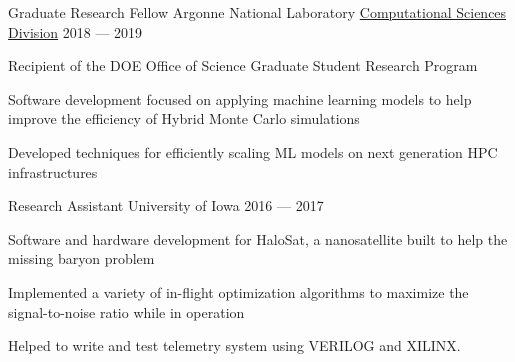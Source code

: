 \begin{cventries}
  \cventry
  {Graduate Research Fellow} %
  {Argonne National Laboratory} %
  {\href{https://www.anl.gov/cps}{\textcolor{awesome}{Computational Sciences Division}}} %
  {2018 --- 2019} %
  {
    \begin{cvitems}%
    \item{Recipient of the DOE Office of Science Graduate Student Research Program}
    \item{Software development focused on applying machine learning models to
      help improve the efficiency of Hybrid Monte Carlo simulations}
    \item{Developed techniques for efficiently scaling ML models on next
        generation HPC infrastructures}
    \end{cvitems}
  }

  \cventry%
  {Research Assistant} %
  {University of Iowa} %
  {\color{awesome}{Department of Physics \& Astronomy}} %
  {2016 --- 2017} %
  {
  \begin{cvitems}%
    \item{Software and hardware development for HaloSat, a nanosatellite
      built to help the missing baryon problem}
    \item{Implemented a variety of in-flight optimization algorithms to
        maximize the signal-to-noise ratio while in operation}
    \item{Helped to write and test telemetry system using VERILOG and XILINX.}
  \end{cvitems}%
  }


\end{cventries}
